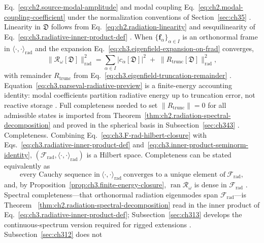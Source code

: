 Eq.~\eqref{eq:ch2.source-modal-amplitude} and modal coupling
Eq.~\eqref{eq:ch2.modal-coupling-coefficient} under the normalization conventions of Section~\ref{sec:ch35}
\cite{stratton1941}. Linearity in \(\mathfrak{D}\) follows from
Eq.~\eqref{eq:ch2.radiation-linearity} and sesquilinearity of
Eq.~\eqref{eq:ch3.radiative-inner-product-def} \cite{stratton1941}.
When \(\{\mathbf{f}_\alpha\}_{\alpha\in I}\) is an orthonormal frame in
\(\langle\cdot,\cdot\rangle_{\mathrm{rad}}\) and the expansion
Eq.~\eqref{eq:ch3.eigenfield-expansion-on-frad} converges,
\begin{equation}
\label{eq:ch3.parseval-radiative-preview}
\|\mathcal{R}_\omega[\mathfrak{D}]\|_{\mathrm{rad}}^{2}
=
\sum_{\alpha\in I}
\big|c_\alpha[\mathfrak{D}]\big|^{2}
\;+\;
\|R_{\mathrm{trunc}}[\mathfrak{D}]\|_{\mathrm{rad}}^{2},
\end{equation}
with remainder \(R_{\mathrm{trunc}}\) from Eq.~\eqref{eq:ch3.eigenfield-truncation-remainder}
\cite{stratton1941}. Equation~\eqref{eq:ch3.parseval-radiative-preview} is a finite-energy
accounting identity: modal coefficients partition radiative energy up to truncation error, not reactive storage
\cite{harrington2001}. Full completeness needed to set \(\|R_{\mathrm{trunc}}\|=0\) for all admissible states
is imported from Theorem~\ref{thm:ch2.radiation-spectral-decomposition} and proved in the spherical basis in
Subsection~\ref{sec:ch343} \cite{stratton1941}.
Completeness. Combining Eq.~\eqref{eq:ch3.F-rad-hilbert-closure} with
Eqs.~\eqref{eq:ch3.radiative-inner-product-def} and~\eqref{eq:ch3.inner-product-seminorm-identity},
\((\mathcal{F}_{\mathrm{rad}},\langle\cdot,\cdot\rangle_{\mathrm{rad}})\) is a Hilbert space. Completeness
can be stated equivalently as
\begin{equation}
\label{eq:ch3.completeness-radiative-characterization}
\text{every Cauchy sequence in}\ \langle\cdot,\cdot\rangle_{\mathrm{rad}}
\ \text{converges to a unique element of}\ \mathcal{F}_{\mathrm{rad}},
\end{equation}
and, by Proposition~\ref{prop:ch3.finite-energy-closure}, \(\operatorname{ran}\mathcal{R}_\omega\) is dense in
\(\mathcal{F}_{\mathrm{rad}}\) \cite{stratton1941}. Spectral completeness---that
orthonormal radiation eigenmodes span \(\mathcal{F}_{\mathrm{rad}}\)---is Theorem
~\ref{thm:ch2.radiation-spectral-decomposition} read in the inner product of
Eq.~\eqref{eq:ch3.radiative-inner-product-def}; Subsection~\ref{sec:ch313} develops the continuous-spectrum
version required for rigged extensions \cite{stratton1941}. Subsection~\ref{sec:ch312} does not
